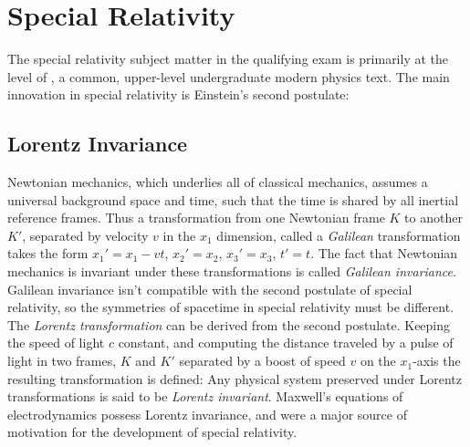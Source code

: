 \newpage
\chapter{Special Relativity}
\label{sec:specrel}
The special relativity subject matter in the qualifying exam is primarily at the level of \cite{ohanianModernPhysics1995}, a common, upper-level undergraduate modern physics text. The main innovation in special relativity is Einstein's second postulate:

\section{Lorentz Invariance}
Newtonian mechanics, which underlies all of classical mechanics, assumes a universal background space and time, such that the time is shared by all inertial reference frames. Thus a transformation from one Newtonian frame $K$ to another $K'$, separated by velocity $v$ in the $x_1$ dimension, called a \textit{Galilean} transformation takes the form $x_1'=x_1-vt$, $x_2'=x_2$, $x_3'=x_3$, $t'=t$. The fact that Newtonian mechanics is invariant under these transformations is called \textit{Galilean invariance}.\\
\indent Galilean invariance isn't compatible with the second postulate of special relativity, so the symmetries of spacetime in special relativity must be different. The \textit{Lorentz transformation} can be derived from the second postulate. Keeping the speed of light $c$ constant, and computing the distance traveled by a pulse of light in two frames, $K$ and $K'$ separated by a boost of speed $v$ on the $x_1$-axis the resulting transformation is defined:
Any physical system preserved under Lorentz transformations is said to be \textit{Lorentz invariant}. Maxwell's equations of electrodynamics possess Lorentz invariance, and were a major source of motivation for the development of special relativity.

